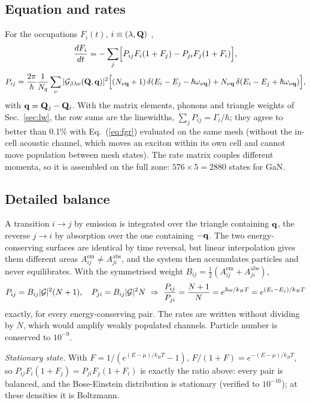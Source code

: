 \subsection{Equation and rates}
For the occupations $F_i(t)$, $i\equiv(\lambda,\mathbf{Q})$
\cite{Zhou2021Perturbo,Chen2020},
\begin{equation}
\frac{dF_i}{dt}=-\sum_j\Bigl[P_{ij}F_i(1+F_j)-P_{ji}F_j(1+F_i)\Bigr],
\label{eq:bte}
\end{equation}
\begin{equation}
P_{ij}=\frac{2\pi}{\hbar}\frac{1}{N_q}\sum_\nu|\mathcal{G}_{\beta\lambda\nu}(\mathbf{Q},\mathbf{q})|^2
\Bigl[(N_{\nu\mathbf{q}}+1)\,\delta(E_i-E_j-\hbar\omega_{\nu\mathbf{q}})+N_{\nu\mathbf{q}}\,\delta(E_i-E_j+\hbar\omega_{\nu\mathbf{q}})\Bigr],
\end{equation}
with $\mathbf{q}=\mathbf{Q}_j-\mathbf{Q}_i$. With the matrix elements, phonons and triangle weights of
Sec.~\ref{sec:lw}, the row sums are the linewidths, $\sum_jP_{ij}=\Gamma_i/\hbar$;
they agree to better than 0.1\% with Eq.~(\ref{eq:fgr}) evaluated on the same mesh
(without the in-cell acoustic channel, which moves an exciton within its own
cell and cannot move population between mesh states). The rate matrix couples
different momenta, so it is assembled on the full zone: $576\times5=2880$ states
for GaN.

\subsection{Detailed balance}
A transition $i\to j$ by emission is integrated over the triangle containing
$\mathbf{q}$, the reverse $j\to i$ by absorption over the one containing $-\mathbf{q}$. The
two energy-conserving surfaces are identical by time reversal, but linear
interpolation gives them different areas $A^{\mathrm{em}}_{ij}\neq A^{\mathrm{abs}}_{ji}$,
and the system then accumulates particles and never equilibrates. With the
symmetrised weight $B_{ij}=\tfrac12(A^{\mathrm{em}}_{ij}+A^{\mathrm{abs}}_{ji})$,
\begin{equation}
P_{ij}=B_{ij}|\G|^2(N+1),\quad P_{ji}=B_{ij}|\G|^2N
\ \Rightarrow\ \frac{P_{ij}}{P_{ji}}=\frac{N+1}{N}=e^{\hbar\omega/k_BT}=e^{(E_i-E_j)/k_BT}
\end{equation}
exactly, for every energy-conserving pair. The rates are written without
dividing by $N$, which would amplify weakly populated channels. Particle number
is conserved to $10^{-9}$.

\emph{Stationary state.} With
$F=1/(e^{(E-\mu)/k_BT}-1)$, $F/(1+F)=e^{-(E-\mu)/k_BT}$, so
$P_{ij}F_i(1+F_j)=P_{ji}F_j(1+F_i)$ is exactly the ratio above: every pair is
balanced, and the Bose-Einstein distribution is stationary (verified to
$10^{-16}$); at these densities it is Boltzmann.

